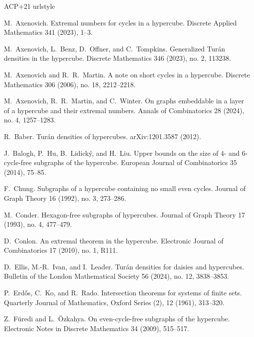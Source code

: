 \documentclass[11pt]{article}
\theoremstyle{plain}
\theoremstyle{definition}
\begin{document}
    \begin{thebibliography}{ACP+21}
    \providecommand{\url}[1]{\texttt{#1}}
    \providecommand{\urlprefix}{\textsc{url:} }
    \expandafter\ifx\csname urlstyle\endcsname\relax
      \providecommand{\doi}[1]{doi:\discretionary{}{}{}#1}\else
      \providecommand{\doi}{doi:\discretionary{}{}{}\begingroup \urlstyle{rm}\Url}\fi

M.~Axenovich.
\newblock Extremal numbers for cycles in a hypercube.
Discrete Applied Mathematics 341 (2023), 1--3.

M.~Axenovich, L.~Benz, D.~Offner, and C.~Tompkins.
\newblock Generalized Tur\'an densities in the hypercube.
Discrete Mathematics 346 (2023), no. 2, 113238.

M.~Axenovich and R.~R.~Martin.
\newblock A note on short cycles in a hypercube.
Discrete Mathematics 306 (2006), no. 18, 2212--2218.

M.~Axenovich, R.~R.~Martin, and C.~Winter.
\newblock On graphs embeddable in a layer of a hypercube and their extremal numbers.
Annals of Combinatorics 28 (2024), no. 4, 1257--1283.

R.~Baber.
\newblock Tur\'an densities of hypercubes.
arXiv:1201.3587 (2012).

J.~Balogh, P.~Hu, B.~Lidick\'y, and H.~Liu.
\newblock Upper bounds on the size of 4- and 6-cycle-free subgraphs of the hypercube.
European Journal of Combinatorics 35 (2014), 75--85.

F.~Chung.
\newblock Subgraphs of a hypercube containing no small even cycles. 
Journal of Graph Theory 16 (1992), no. 3, 273--286.

M.~Conder.
\newblock Hexagon-free subgraphs of hypercubes.
Journal of Graph Theory 17 (1993), no. 4, 477--479.

D.~Conlon.
\newblock An extremal theorem in the hypercube.
Electronic Journal of Combinatorics 17 (2010), no. 1, R111.

D.~Ellis, M.-R.~Ivan, and I.~Leader.
\newblock Tur\'an densities for daisies and hypercubes.
Bulletin of the London Mathematical Society 56 (2024), no. 12, 3838--3853.

P.~Erd\H{o}s, C.~Ko, and R.~Rado.
\newblock Intersection theorems for systems of finite sets.
Quarterly Journal of Mathematics, Oxford Series (2), 12 (1961), 313--320.

Z.~F\"uredi and L.~\"Ozkahya.
\newblock On even-cycle-free subgraphs of the hypercube.
Electronic Notes in Discrete Mathematics 34 (2009), 515--517.


\end{thebibliography}
\end{document}
